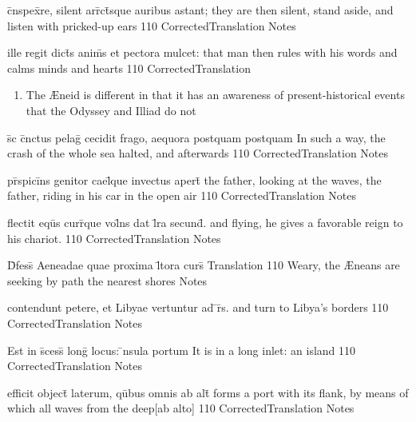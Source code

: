 \latline
  {c\={}nspex\={}re, silent arr\={}ct\={\macron {\i}}sque auribus astant;}
  { they are then silent, stand aside, and listen with pricked-up ears }
  {110}
  { CorrectedTranslation }
  { Notes }


\latline
  {ille regit dict\={\macron {\i}}s anim\={}s et pectora mulcet:}
  { that man then rules with his words and calms minds and hearts }
  {110}
  { CorrectedTranslation }
  { \begin{enumerate}
  	\item The {\AE}neid is different in that it has an awareness of present-historical events that the Odyssey and Illiad do not
  \end{enumerate} }


\latline
  {s\={\macron {\i}}c c\={}nctus pelag\={\macron {\i}} cecidit frago, aequora postquam postquam}
  { In such a way, the crash of the whole sea halted, and afterwards }
  {110}
  { CorrectedTranslation }
  { Notes }


\latline
  {pr\={}spici\={}ns genitor cael\={}que invectus apert\={}}
  { the father, looking at the waves, the father, riding in his car in the open air }
  {110}
  { CorrectedTranslation }
  { Notes }


\latline
  {flectit equ\={}s curr\={}que vol\={}ns dat l\={}ra secund\={}.}
  { and flying, he gives a favorable reign to his chariot. }
  {110}
  { CorrectedTranslation }
  { Notes }



\latline
  {D\={}fess\={\macron {\i}} Aeneadae quae proxima l\={\macron {\i}}tora curs\={}}
  { Translation }
  {110}
  { Weary, the {\AE}neans are seeking by path the nearest shores }
  { Notes }


\latline
  {contendunt petere, et Libyae vertuntur ad \={}r\={}s.}
  { and turn to Libya's borders }
  {110}
  { CorrectedTranslation }
  { Notes }


\latline
  {Est in s\={}cess\={} long\={} locus: \={\macron {\i}}nsula portum}
  { It is in a long inlet: an island }
  {110}
  { CorrectedTranslation }
  { Notes }



\latline
  {efficit object\={} laterum, qu\={\macron {\i}}bus omnis ab alt\={}}
  { forms a port with its flank, by means of which all waves from the deep[ab alto] }
  {110}
  { CorrectedTranslation }
  { Notes }


